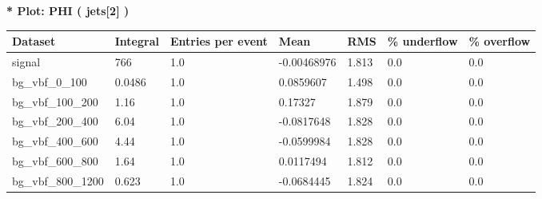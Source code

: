 \documentclass[a4paper, 10pt]{article}
\begin{document}
\textbf{* Plot: PHI ( jets[2] ) }\\
   \begin{table}[H]
  \begin{center}
    \begin{tabular}{|m{23.0mm}|m{23.0mm}|m{18.0mm}|m{19.0mm}|m{19.0mm}|m{19.0mm}|m{19.0mm}|}
      \hline
      {\cellcolor{yellow}         Dataset}& {\cellcolor{yellow}         Integral}& {\cellcolor{yellow}         Entries per event}& {\cellcolor{yellow}         Mean}& {\cellcolor{yellow}         RMS}& {\cellcolor{yellow}         \% underflow}& {\cellcolor{yellow}         \% overflow}\\
      \hline
      {\cellcolor{white}         signal}& {\cellcolor{white}         766}& {\cellcolor{white}         1.0}& {\cellcolor{white}         -0.00468976}& {\cellcolor{white}         1.813}& {\cellcolor{green}         0.0}& {\cellcolor{green}         0.0}\\
      \hline
      {\cellcolor{white}         bg\_vbf\_0\_100}& {\cellcolor{white}         0.0486}& {\cellcolor{white}         1.0}& {\cellcolor{white}         0.0859607}& {\cellcolor{white}         1.498}& {\cellcolor{green}         0.0}& {\cellcolor{green}         0.0}\\
      \hline
      {\cellcolor{white}         bg\_vbf\_100\_200}& {\cellcolor{white}         1.16}& {\cellcolor{white}         1.0}& {\cellcolor{white}         0.17327}& {\cellcolor{white}         1.879}& {\cellcolor{green}         0.0}& {\cellcolor{green}         0.0}\\
      \hline
      {\cellcolor{white}         bg\_vbf\_200\_400}& {\cellcolor{white}         6.04}& {\cellcolor{white}         1.0}& {\cellcolor{white}         -0.0817648}& {\cellcolor{white}         1.828}& {\cellcolor{green}         0.0}& {\cellcolor{green}         0.0}\\
      \hline
      {\cellcolor{white}         bg\_vbf\_400\_600}& {\cellcolor{white}         4.44}& {\cellcolor{white}         1.0}& {\cellcolor{white}         -0.0599984}& {\cellcolor{white}         1.828}& {\cellcolor{green}         0.0}& {\cellcolor{green}         0.0}\\
      \hline
      {\cellcolor{white}         bg\_vbf\_600\_800}& {\cellcolor{white}         1.64}& {\cellcolor{white}         1.0}& {\cellcolor{white}         0.0117494}& {\cellcolor{white}         1.812}& {\cellcolor{green}         0.0}& {\cellcolor{green}         0.0}\\
      \hline
      {\cellcolor{white}         bg\_vbf\_800\_1200}& {\cellcolor{white}         0.623}& {\cellcolor{white}         1.0}& {\cellcolor{white}         -0.0684445}& {\cellcolor{white}         1.824}& {\cellcolor{green}         0.0}& {\cellcolor{green}         0.0}\\

\end{tabular}
\end{center}
\end{table}
\end{document}

